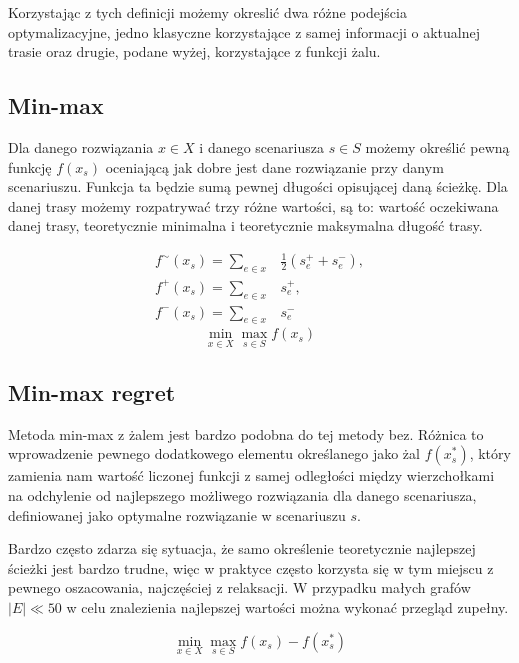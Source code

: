 \documentclass[10pt]{article}
\def\fsim{f^\sim(x_s)}
\def\fplu{f^+(x_s)}
\def\fmin{f^-(x_s)}
\def\fraw{f(x_s)}
\def\fide{f(x_s^*)}
\begin{document}
Korzystając z tych definicji możemy okreslić dwa różne podejścia optymalizacyjne, jedno klasyczne korzystające z samej informacji o aktualnej trasie oraz drugie, podane wyżej, korzystające z funkcji żalu.

\subsection{Min-max}
Dla danego rozwiązania $x \in X$ i danego scenariusza $s \in S$ możemy określić pewną funkcję $f(x_s)$ oceniającą jak dobre jest dane rozwiązanie przy danym scenariuszu. Funkcja ta będzie sumą pewnej długości opisującej daną ścieżkę. Dla danej trasy możemy rozpatrywać trzy różne wartości, są to: wartość oczekiwana danej trasy, teoretycznie minimalna i teoretycznie maksymalna długość trasy.

\begin{eqnarray}
  \fsim = \sum_{e \in x}& \frac{1}{2}\left(s_e^+ +  s_e^-\right), \\
  \fplu = \sum_{e \in x}& s_e^+, \\
  \fmin = \sum_{e \in x}& s_e^-
\end{eqnarray}
\begin{equation}
  \min_{x \in X} \max_{s \in S} \fraw
\end{equation}

\subsection{Min-max regret}
Metoda min-max z żalem jest bardzo podobna do tej metody bez. Różnica to wprowadzenie pewnego dodatkowego elementu określanego jako żal $\fide$, który zamienia nam wartość liczonej funkcji z samej odległości między wierzchołkami na odchylenie od najlepszego możliwego rozwiązania dla danego scenariusza, definiowanej jako optymalne rozwiązanie w scenariuszu $s$.

Bardzo często zdarza się sytuacja, że samo określenie teoretycznie najlepszej ścieżki jest bardzo trudne, więc w praktyce często korzysta się w tym miejscu z pewnego oszacowania, najczęściej z relaksacji. W przypadku małych grafów $|E| \ll 50$ w celu znalezienia najlepszej wartości można wykonać przegląd zupełny.

\begin{equation}
  \min_{x \in X} \max_{s \in S} \fraw - \fide
\end{equation}
\end{document}
